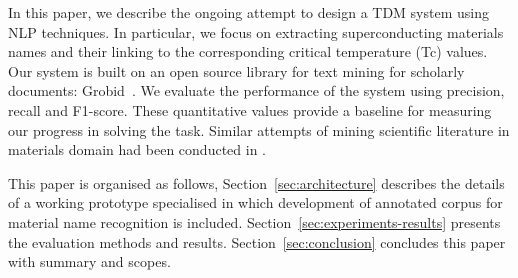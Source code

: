 \documentclass{article}[a4]
\begin{document}



In this paper, we describe the ongoing attempt to design a TDM system using NLP techniques. In particular, we focus on extracting superconducting materials names and their linking to the corresponding critical temperature (Tc) values. Our system is built on an open source library for text mining for scholarly documents: Grobid~\cite{GROBID}. We evaluate the performance of the system using precision, recall and F1-score. These quantitative values provide a baseline for measuring our progress in solving the task. Similar attempts of mining scientific literature in materials domain had been conducted in \cite{nanocrystal_extraction} \cite{court2018auto}. 

This paper is organised as follows, Section~\ref{sec:architecture} describes the details of a working prototype specialised in which development of annotated corpus for material name recognition is included. Section~\ref{sec:experiments-results} presents the evaluation methods and results. Section~\ref{sec:conclusion} concludes this paper with summary and scopes.
\end{document}
